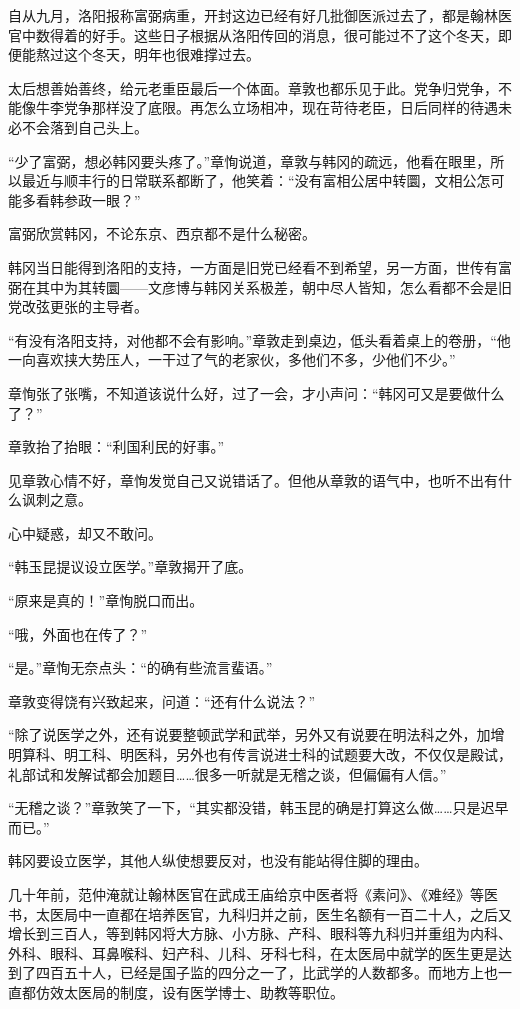 自从九月，洛阳报称富弼病重，开封这边已经有好几批御医派过去了，都是翰林医官中数得着的好手。这些日子根据从洛阳传回的消息，很可能过不了这个冬天，即便能熬过这个冬天，明年也很难撑过去。

太后想善始善终，给元老重臣最后一个体面。章敦也都乐见于此。党争归党争，不能像牛李党争那样没了底限。再怎么立场相冲，现在苛待老臣，日后同样的待遇未必不会落到自己头上。

“少了富弼，想必韩冈要头疼了。”章恂说道，章敦与韩冈的疏远，他看在眼里，所以最近与顺丰行的日常联系都断了，他笑着：“没有富相公居中转圜，文相公怎可能多看韩参政一眼？”

富弼欣赏韩冈，不论东京、西京都不是什么秘密。

韩冈当日能得到洛阳的支持，一方面是旧党已经看不到希望，另一方面，世传有富弼在其中为其转圜——文彦博与韩冈关系极差，朝中尽人皆知，怎么看都不会是旧党改弦更张的主导者。

“有没有洛阳支持，对他都不会有影响。”章敦走到桌边，低头看着桌上的卷册，“他一向喜欢挟大势压人，一干过了气的老家伙，多他们不多，少他们不少。”

章恂张了张嘴，不知道该说什么好，过了一会，才小声问：“韩冈可又是要做什么了？”

章敦抬了抬眼：“利国利民的好事。”

见章敦心情不好，章恂发觉自己又说错话了。但他从章敦的语气中，也听不出有什么讽刺之意。

心中疑惑，却又不敢问。

“韩玉昆提议设立医学。”章敦揭开了底。

“原来是真的！”章恂脱口而出。

“哦，外面也在传了？”

“是。”章恂无奈点头：“的确有些流言蜚语。”

章敦变得饶有兴致起来，问道：“还有什么说法？”

“除了说医学之外，还有说要整顿武学和武举，另外又有说要在明法科之外，加增明算科、明工科、明医科，另外也有传言说进士科的试题要大改，不仅仅是殿试，礼部试和发解试都会加题目……很多一听就是无稽之谈，但偏偏有人信。”

“无稽之谈？”章敦笑了一下，“其实都没错，韩玉昆的确是打算这么做……只是迟早而已。”

韩冈要设立医学，其他人纵使想要反对，也没有能站得住脚的理由。

几十年前，范仲淹就让翰林医官在武成王庙给京中医者将《素问》、《难经》等医书，太医局中一直都在培养医官，九科归并之前，医生名额有一百二十人，之后又增长到三百人，等到韩冈将大方脉、小方脉、产科、眼科等九科归并重组为内科、外科、眼科、耳鼻喉科、妇产科、儿科、牙科七科，在太医局中就学的医生更是达到了四百五十人，已经是国子监的四分之一了，比武学的人数都多。而地方上也一直都仿效太医局的制度，设有医学博士、助教等职位。


